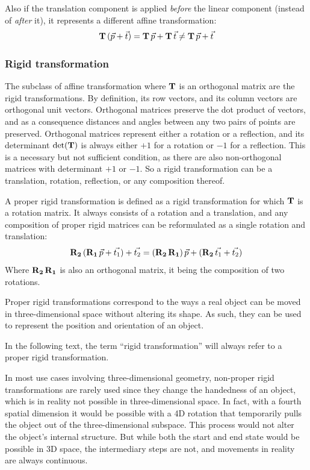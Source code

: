 Also if the translation component is applied \emph{before} the linear component (instead of \emph{after} it), it represents a different affine transformation:
\begin{equation}
	\mathbf{T} \, (\vec{p} + \vec{t}) = \mathbf{T} \, \vec{p} + \mathbf{T} \, \vec{t} \neq \mathbf{T} \, \vec{p} + \vec{t}
\end{equation}


\subsubsection{Rigid transformation}
The subclass of affine transformation where $\mathbf{T}$ is an orthogonal matrix are the rigid transformations. By definition, its row vectors, and its column vectors are orthogonal unit vectors. Orthogonal matrices preserve the dot product of vectors, and as a consequence distances and angles between any two pairs of points are preserved. Orthogonal matrices represent either a rotation or a reflection, and its determinant $\det(\mathbf{T})$ is always either $+1$ for a rotation or $-1$ for a reflection. This is a necessary but not sufficient condition, as there are also non-orthogonal matrices with determinant $+1$ or $-1$. So a rigid transformation can be a translation, rotation, reflection, or any composition thereof.

A proper rigid transformation is defined as a rigid transformation for which $\mathbf{T}$ is a rotation matrix. It always consists of a rotation and a translation, and any composition of proper rigid matrices can be reformulated as a single rotation and translation:
\begin{equation}
	\mathbf{R_2} \, (\mathbf{R_1} \, \vec{p} + \vec{t_1}) + \vec{t_2} = (\mathbf{R_2} \, \mathbf{R_1}) \, \vec{p} + (\mathbf{R_2} \, \vec{t_1} + \vec{t_2})
\end{equation}
Where $\mathbf{R_2} \, \mathbf{R_1}$ is also an orthogonal matrix, it being the composition of two rotations.

Proper rigid transformations correspond to the ways a real object can be moved in three-dimensional space without altering its shape. As such, they can be used to represent the position and orientation of an object.

In the following text, the term ``rigid transformation'' will always refer to a proper rigid transformation.

In most use cases involving three-dimensional geometry, non-proper rigid transformations are rarely used since they change the handedness of an object, which is in reality not possible in three-dimensional space. In fact, with a fourth spatial dimension it would be possible with a 4D rotation that temporarily pulls the object out of the three-dimensional subspace. This process would not alter the object's internal structure. But while both the start and end state would be possible in 3D space, the intermediary steps are not, and movements in reality are always continuous.

